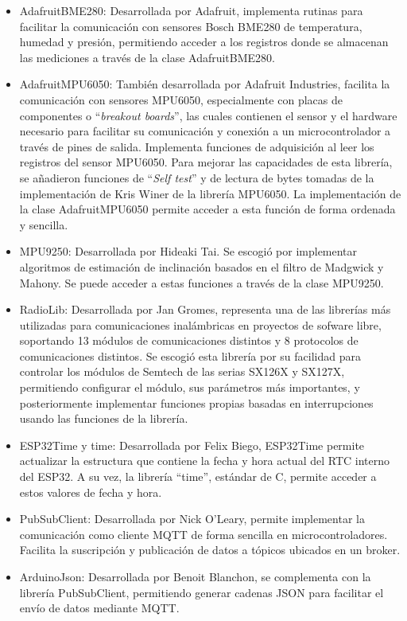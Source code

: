 \begin{itemize}
    \item AdafruitBME280: Desarrollada por Adafruit, implementa rutinas para facilitar la comunicación con sensores Bosch BME280 de temperatura, humedad y presión, permitiendo acceder a los registros donde se almacenan las mediciones a través de la clase AdafruitBME280.
    \item AdafruitMPU6050: También desarrollada por Adafruit Industries, facilita la comunicación con sensores MPU6050, especialmente con placas de componentes o ``\textit{breakout boards}'', las cuales contienen el sensor y el hardware necesario para facilitar su comunicación y conexión a un microcontrolador a través de pines de salida. Implementa funciones de adquisición al leer los registros del sensor MPU6050. Para mejorar las capacidades de esta librería, se añadieron funciones de ``\textit{Self test}'' y de lectura de bytes tomadas de la implementación de Kris Winer de la librería MPU6050. La implementación de la clase AdafruitMPU6050 permite acceder a esta función de forma ordenada y sencilla.
    \item MPU9250: Desarrollada por Hideaki Tai. Se escogió por implementar algoritmos de estimación de inclinación basados en el filtro de Madgwick y Mahony. Se puede acceder a estas funciones a través de la clase MPU9250.
    \item RadioLib: Desarrollada por Jan Gromes, representa una de las librerías más utilizadas para comunicaciones inalámbricas en proyectos de sofware libre, soportando 13 módulos de comunicaciones distintos y 8 protocolos de comunicaciones distintos. Se escogió esta librería por su facilidad para controlar los módulos de Semtech de las serias SX126X y SX127X, permitiendo configurar el módulo, sus parámetros más importantes, y posteriormente implementar funciones propias basadas en interrupciones usando las funciones de la librería.
    \item ESP32Time y time: Desarrollada por Felix Biego, ESP32Time permite actualizar la estructura que contiene la fecha y hora actual del RTC interno del ESP32. A su vez, la librería ``time'', estándar de C, permite acceder a estos valores de fecha y hora. 
    \item PubSubClient: Desarrollada por Nick O'Leary, permite implementar la comunicación como cliente MQTT de forma sencilla en microcontroladores. Facilita la suscripción y publicación de datos a tópicos ubicados en un broker.
    \item ArduinoJson: Desarrollada por Benoit Blanchon, se complementa con la librería PubSubClient, permitiendo generar cadenas JSON para facilitar el envío de datos mediante MQTT.
\end{itemize}

